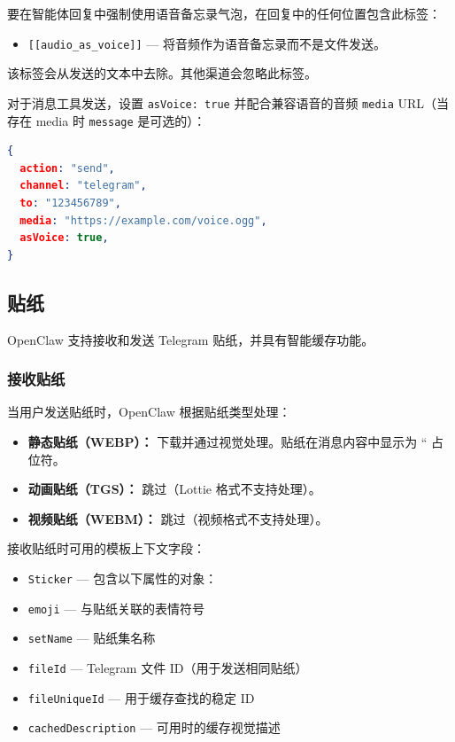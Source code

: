 要在智能体回复中强制使用语音备忘录气泡，在回复中的任何位置包含此标签：

\begin{itemize}
  \item \texttt{[[audio\_as\_voice]]} — 将音频作为语音备忘录而不是文件发送。
\end{itemize}


该标签会从发送的文本中去除。其他渠道会忽略此标签。

对于消息工具发送，设置 \texttt{asVoice: true} 并配合兼容语音的音频 \texttt{media} URL（当存在 media 时 \texttt{message} 是可选的）：

\begin{lstlisting}[language=json]
{
  action: "send",
  channel: "telegram",
  to: "123456789",
  media: "https://example.com/voice.ogg",
  asVoice: true,
}
\end{lstlisting}


\subsection{贴纸}


OpenClaw 支持接收和发送 Telegram 贴纸，并具有智能缓存功能。

\subsubsection{接收贴纸}


当用户发送贴纸时，OpenClaw 根据贴纸类型处理：

\begin{itemize}
  \item \textbf{静态贴纸（WEBP）：} 下载并通过视觉处理。贴纸在消息内容中显示为 `` 占位符。
  \item \textbf{动画贴纸（TGS）：} 跳过（Lottie 格式不支持处理）。
  \item \textbf{视频贴纸（WEBM）：} 跳过（视频格式不支持处理）。
\end{itemize}


接收贴纸时可用的模板上下文字段：

\begin{itemize}
  \item \texttt{Sticker} — 包含以下属性的对象：
  \item \texttt{emoji} — 与贴纸关联的表情符号
  \item \texttt{setName} — 贴纸集名称
  \item \texttt{fileId} — Telegram 文件 ID（用于发送相同贴纸）
  \item \texttt{fileUniqueId} — 用于缓存查找的稳定 ID
  \item \texttt{cachedDescription} — 可用时的缓存视觉描述
\end{itemize}


